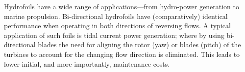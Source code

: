 \begin{Abstractpage}

\setlength{\baselineskip}{1.5\baselineskip}  {Hydrofoils have a wide range of
applications---from hydro-power generation to marine propulsion. Bi-directional
hydrofoils have (comparatively) identical performance when operating in both
directions of reversing flows. A typical application of such foils is tidal
current power generation; where by using bi-directional blades the need for
aligning the rotor (yaw) or blades (pitch) of the turbines to account for the
changing flow direction is eliminated. This leads to lower initial, and more
importantly, maintenance costs.}


\end{Abstractpage}
